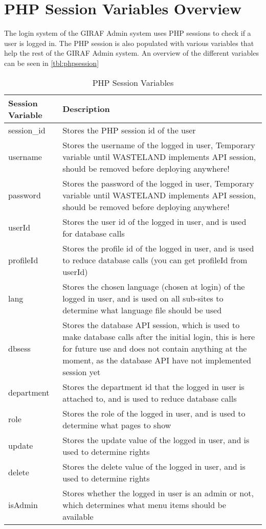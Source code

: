 \section{PHP Session Variables Overview}
The login system of the GIRAF Admin system uses PHP sessions to check if a user is logged in. The PHP session is also populated with various variables that help the rest of the GIRAF Admin system. An overview of the different variables can be seen in \autoref{tbl:phpsession}
\begin{table}[h]
\begin{tabularx}{\linewidth}{| l | X |}
\hline
Session Variable & Description \\ \hline
session\_id & Stores the PHP session id of the user \\ \hline
username & Stores the username of the logged in user, {\color{red} Temporary variable until WASTELAND implements API session, should be removed before deploying anywhere!} \\ \hline
password & Stores the password of the logged in user, {\color{red} Temporary variable until WASTELAND implements API session, should be removed before deploying anywhere!} \\ \hline
userId & Stores the user id of the logged in user, and is used for database calls \\ \hline
profileId & Stores the profile id of the logged in user, and is used to reduce database calls (you can get profileId from userId) \\ \hline
lang & Stores the chosen language (chosen at login) of the logged in user, and is used on all sub-sites to determine what language file should be used \\ \hline
dbsess & Stores the database API session, which is used to make database calls after the initial login, {\color{red} this is here for future use and does not contain anything at the moment, as the database API have not implemented session yet} \\ \hline
department & Stores the department id that the logged in user is attached to, and is used to reduce database calls \\ \hline
role & Stores the role of the logged in user, and is used to determine what pages to show \\ \hline
update & Stores the update value of the logged in user, and is used to determine rights \\ \hline
delete & Stores the delete value of the logged in user, and is used to determine rights \\ \hline
isAdmin & Stores whether the logged in user is an admin or not, which determines what menu items should be available \\
\hline
\end{tabularx}
\caption{PHP Session Variables}
\label{tbl:phpsession}
\end{table}
